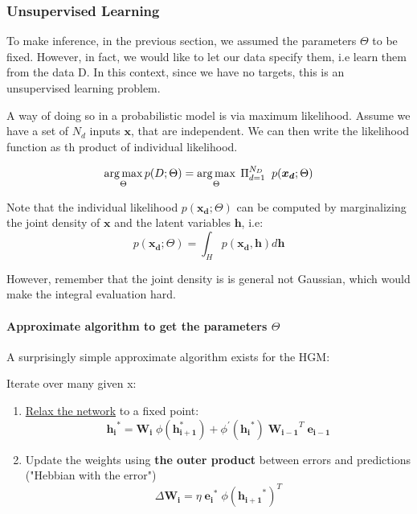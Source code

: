 \documentclass[main]{subfiles}
\begin{document}
\subsubsection{Unsupervised Learning}
To make inference, in the previous section, we assumed the parameters $\Theta$ to be fixed. However, in fact, we would like to let our data specify them, i.e learn them from the data D. In this context, since we have no targets, this is an unsupervised learning problem.

A way of doing so in a probabilistic model is via maximum likelihood. Assume we have a set of $N_d$ inputs $\bm{x}$, that are independent. We can then write the likelihood function as th product of individual likelihood. 

\begin{equation}
    \operatorname*{arg\,max}_\Theta p(D; \Theta) = \operatorname*{arg\,max}_\Theta \; \Pi_{d=1}^{N_D} \; \; p(\bm{x_d}; \Theta)
\end{equation}

Note that the individual likelihood $p(\bm{x_d}; \Theta)$ can be computed by marginalizing the joint density of $\bm{x}$ and the latent variables $\bm{h}$, i.e:
\begin{equation}
    p(\bm{x_d}; \Theta) = \int_{H} p(\bm{x_d}, \bm{h}) d\bm{h} 
\end{equation}

\noindent However, remember that the joint density is is general not Gaussian, which would make the integral evaluation hard.

\paragraph{Approximate algorithm to get the parameters $\Theta$}
A surprisingly simple approximate algorithm exists for the HGM:

Iterate over many given x:
\begin{enumerate}
    \item \underline{Relax the network} to a fixed point:
        \begin{equation}
            \bm{h_i}^* = \bm{W_i} \; \phi(\bm{h_{i+1}^*}) + \phi^\prime (\bm{h_i}^*) \; \bm{W_{i-1}}^T \; \bm{e_{i-1}}
        \end{equation}
        
    \item Update the weights using \textbf{the outer product} between errors and predictions ("Hebbian with the error")
        \begin{equation}
            \Delta \bm{W_{i}} = \eta  \; \bm{e_i}^* \; \phi(\bm{h_{i+1}}^*)^T
        \end{equation}
\end{enumerate}
\end{document}
